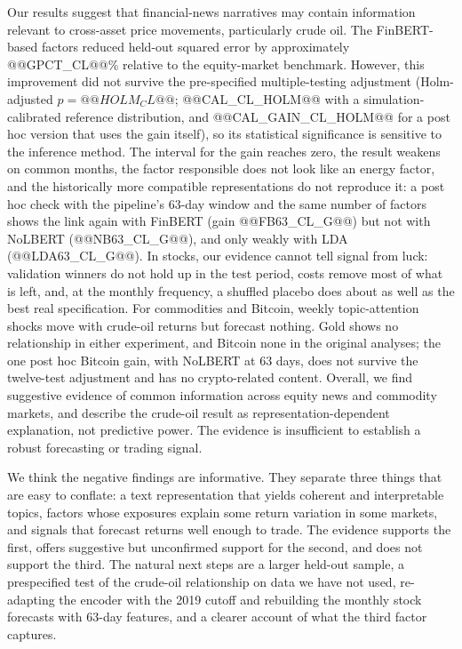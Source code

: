 \documentclass[11pt]{article}
\begin{document}
Our results suggest that financial-news narratives may contain information relevant to cross-asset price movements, particularly crude oil. The FinBERT-based factors reduced held-out squared error by approximately @@GPCT_CL@@\% relative to the equity-market benchmark. However, this improvement did not survive the pre-specified multiple-testing adjustment (Holm-adjusted $p=@@HOLM_CL@@$; @@CAL_CL_HOLM@@ with a simulation-calibrated reference distribution, and @@CAL_GAIN_CL_HOLM@@ for a post hoc version that uses the gain itself), so its statistical significance is sensitive to the inference method. The interval for the gain reaches zero, the result weakens on common months, the factor responsible does not look like an energy factor, and the historically more compatible representations do not reproduce it: a post hoc check with the pipeline's 63-day window and the same number of factors shows the link again with FinBERT (gain @@FB63_CL_G@@) but not with NoLBERT (@@NB63_CL_G@@), and only weakly with LDA (@@LDA63_CL_G@@). In stocks, our evidence cannot tell signal from luck: validation winners do not hold up in the test period, costs remove most of what is left, and, at the monthly frequency, a shuffled placebo does about as well as the best real specification. For commodities and Bitcoin, weekly topic-attention shocks move with crude-oil returns but forecast nothing. Gold shows no relationship in either experiment, and Bitcoin none in the original analyses; the one post hoc Bitcoin gain, with NoLBERT at 63 days, does not survive the twelve-test adjustment and has no crypto-related content. Overall, we find suggestive evidence of common information across equity news and commodity markets, and describe the crude-oil result as representation-dependent explanation, not predictive power. The evidence is insufficient to establish a robust forecasting or trading signal.

We think the negative findings are informative. They separate three things that are easy to conflate: a text representation that yields coherent and interpretable topics, factors whose exposures explain some return variation in some markets, and signals that forecast returns well enough to trade. The evidence supports the first, offers suggestive but unconfirmed support for the second, and does not support the third. The natural next steps are a larger held-out sample, a prespecified test of the crude-oil relationship on data we have not used, re-adapting the encoder with the 2019 cutoff and rebuilding the monthly stock forecasts with 63-day features, and a clearer account of what the third factor captures.
\end{document}
